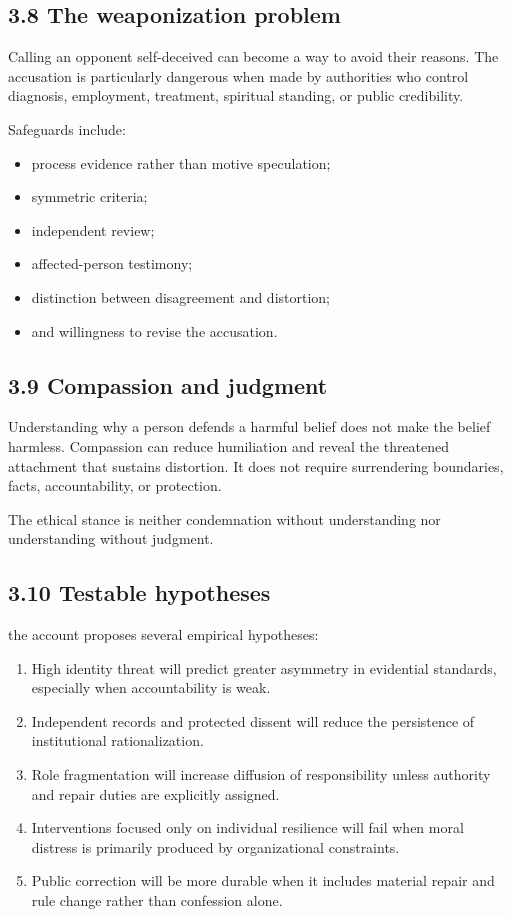 \documentclass[
  11pt,
]{article}
\providecommand{\tightlist}{%
  \setlength{\itemsep}{0pt}\setlength{\parskip}{0pt}}
\begin{document}
\subsection{3.8 The weaponization
problem}\label{the-weaponization-problem}

Calling an opponent self-deceived can become a way to avoid their
reasons. The accusation is particularly dangerous when made by
authorities who control diagnosis, employment, treatment, spiritual
standing, or public credibility.

Safeguards include:

\begin{itemize}
\tightlist
\item
  process evidence rather than motive speculation;
\item
  symmetric criteria;
\item
  independent review;
\item
  affected-person testimony;
\item
  distinction between disagreement and distortion;
\item
  and willingness to revise the accusation.
\end{itemize}

\subsection{3.9 Compassion and judgment}\label{compassion-and-judgment}

Understanding why a person defends a harmful belief does not make the
belief harmless. Compassion can reduce humiliation and reveal the
threatened attachment that sustains distortion. It does not require
surrendering boundaries, facts, accountability, or protection.

The ethical stance is neither condemnation without understanding nor
understanding without judgment.

\subsection{3.10 Testable hypotheses}\label{testable-hypotheses}

the account proposes several empirical hypotheses:

\begin{enumerate}
\def\labelenumi{\arabic{enumi}.}
\tightlist
\item
  High identity threat will predict greater asymmetry in evidential
  standards, especially when accountability is weak.
\item
  Independent records and protected dissent will reduce the persistence
  of institutional rationalization.
\item
  Role fragmentation will increase diffusion of responsibility unless
  authority and repair duties are explicitly assigned.
\item
  Interventions focused only on individual resilience will fail when
  moral distress is primarily produced by organizational constraints.
\item
  Public correction will be more durable when it includes material
  repair and rule change rather than confession alone.
\end{enumerate}
\end{document}
